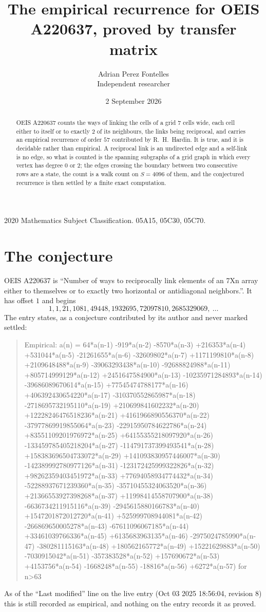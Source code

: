 \documentclass[11pt,a4paper]{article}
\title{The empirical recurrence for OEIS A220637, proved by transfer matrix}
\author{Adrian Perez Fontelles\\ \small Independent researcher}
\date{2 September 2026}
\theoremstyle{plain}
\theoremstyle{definition}
\begin{document}
\maketitle

\begin{abstract}
OEIS A220637 counts the ways of linking the cells of a grid $7$ cells wide, each cell either to
itself or to exactly $2$ of its neighbours, the links being reciprocal, and carries an
empirical recurrence of order $57$ contributed by R.~H.~Hardin. It is true, and it is
decidable rather than empirical. A reciprocal link is an undirected edge and a self-link is
no edge, so what is counted is the spanning subgraphs of a grid graph in which every vertex
has degree $0$ or $2$; the edges crossing the boundary between two consecutive rows are a
state, the count is a walk count on $S=4096$ of them, and the conjectured recurrence is then
settled by a finite exact computation.
\end{abstract}

\noindent\small 2020 Mathematics Subject Classification. 05A15, 05C30, 05C70.\normalsize

\section{The conjecture}

OEIS A220637 is ``Number of ways to reciprocally link elements of an 7Xn array either to themselves or to exactly two horizontal or antidiagonal neighbors.''. It has offset $1$ and begins
\[
1, 1, 21, 1081, 49448, 1932695, 72097810, 2685329069,\ \dots
\]
The entry states, as a conjecture contributed by its author and never marked settled:
\begin{quote}
Empirical: a(n) = 64*a(n-1) -919*a(n-2) -8570*a(n-3) +216353*a(n-4) +531044*a(n-5) -21261655*a(n-6) -32609802*a(n-7) +1171199810*a(n-8) +2109648488*a(n-9) -39063293438*a(n-10) -92688824988*a(n-11) +805714999129*a(n-12) +2451647584900*a(n-13) -10235971284893*a(n-14) -39686089670614*a(n-15) +77545474788177*a(n-16) +406392430654220*a(n-17) -310370552865987*a(n-18) -2718695732195110*a(n-19) +210699841602232*a(n-20) +12228246476518236*a(n-21) +4161966890556370*a(n-22) -37977869919855064*a(n-23) -22915950784622786*a(n-24) +83551109201976972*a(n-25) +64155355218097920*a(n-26) -133459785405218204*a(n-27) -114791737399493541*a(n-28) +158383696504733072*a(n-29) +141093830957446007*a(n-30) -142389992780977126*a(n-31) -123172425999322826*a(n-32) +98262359403451972*a(n-33) +77694058934774432*a(n-34) -52288937671239360*a(n-35) -35710455324063520*a(n-36) +21366553927398268*a(n-37) +11998414558707900*a(n-38) -6636734211915116*a(n-39) -2945615880166783*a(n-40) +1547201872012720*a(n-41) +525999708944081*a(n-42) -266869650005278*a(n-43) -67611096067185*a(n-44) +33461039766336*a(n-45) +6135683963135*a(n-46) -2975024785990*a(n-47) -380281115163*a(n-48) +180562165772*a(n-49) +15221629883*a(n-50) -7030915042*a(n-51) -357383528*a(n-52) +157690672*a(n-53) +4153756*a(n-54) -1668248*a(n-55) -18816*a(n-56) +6272*a(n-57) for n>63
\end{quote}
As of the ``Last modified'' line on the live entry (Oct 03 2025 18:56:04, revision 8) this is still
recorded as empirical, and nothing on the entry records it as proved.
\end{document}
